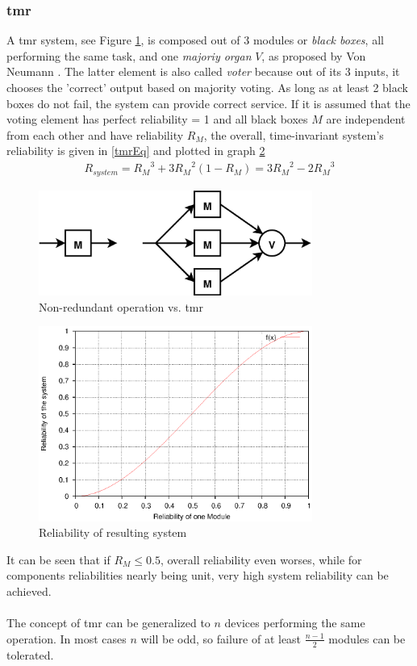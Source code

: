 \subsubsection{\gls{tmr}}
A \gls{tmr} system, see Figure \ref{fig:tmr}, is composed out of 3 modules or \textit{black boxes}, all performing the same task,	
and one \textit{majoriy organ} $V$, as proposed by Von Neumann \cite{vN56}. The latter element
is also called \textit{voter} because out of its 3 inputs, it chooses the 'correct' output based on majority voting. As long as at least 2 black boxes do not
fail, the system can provide correct service. If it is assumed that the voting element has perfect reliability = 1 and all black boxes $M$ are independent from
each other and have reliability $R_M$, the overall, time-invariant system's reliability is given in \ref{tmrEq} \cite{Lyons:1962:UTR:1661979.1661984} and plotted in graph \ref{fig:tmrGrp}
\begin{align}\label{tmrEq}
 R_{system} = {R_M}^3 + 3{R_M}^2(1-R_M) = 3{R_M}^2 - 2{R_M}^3
\end{align}
\begin{figure}
    \centering
    \includegraphics[width=0.8\textwidth]{figures/tmr.eps}
    \caption{Non-redundant operation vs. \gls{tmr}}
    \label{fig:tmr}
\end{figure}
\begin{figure}
    \centering
    \includegraphics[width=0.8\textwidth]{figures/tmrGraph.eps}
    \caption{Reliability of resulting system}
    \label{fig:tmrGrp}
\end{figure}
It can be seen that if $R_M \leq 0.5$, overall reliability even worses, while for components reliabilities nearly being unit, very high system reliability can
be achieved.
\\
\\
The concept of \gls{tmr} can be generalized to $n$ devices performing
the same operation. In most cases $n$ will be odd, so failure of at least $\frac{n-1}{2}$ modules can be tolerated.

